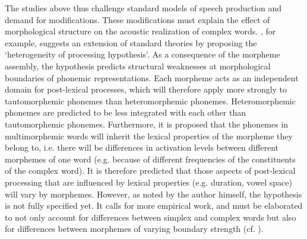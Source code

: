 { The studies above thus challenge standard models of speech production and demand for modifications. These modifications must explain the effect of morphological structure on the acoustic realization of complex words.  
 \cite{CohenGoldberg.2013}, for example, suggests an extension of standard theories by proposing the `heterogeneity of processing hypothesis'. As a consequence of the morpheme assembly, the hypothesis predicts structural weaknesses at morphological boundaries of phonemic representations. Each morpheme acts as an independent domain for post-lexical processes, which will therefore apply more strongly to tautomorphemic phonemes than heteromorphemic phonemes. Heteromorphemic phonemes are predicted to be less integrated with each other than tautomorphemic phonemes. Furthermore, it is proposed that the phonemes in multimorphemic words will inherit the lexical properties of the morpheme they belong to, i.e. there will be differences in activation levels between different morphemes of one word (e.g. because of different frequencies of the constituents of the complex word). It is therefore predicted that those aspects of post-lexical processing that are influenced by lexical properties (e.g. duration, vowel space) will vary by morphemes. 
 However, as noted by the author himself, the hypothesis is not fully specified yet. It calls for more empirical work, and must be elaborated to not only account for differences between simplex and complex words but also for differences between morphemes of varying boundary strength (cf. \citealt[1057 f.]{CohenGoldberg.2013}).
 
}
